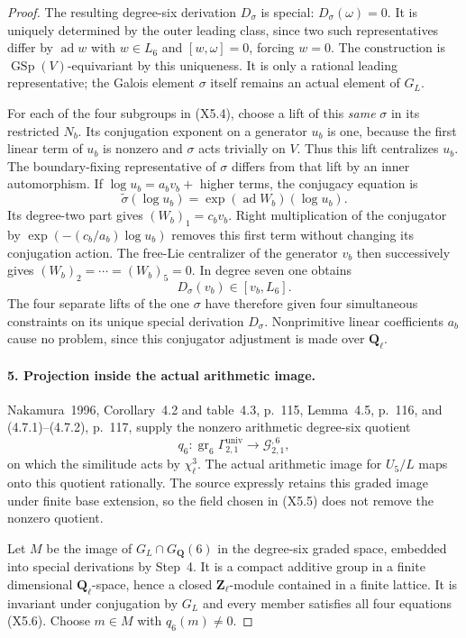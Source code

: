 \begin{proof}
The resulting degree-six derivation $D_\sigma$ is special:
$D_\sigma(\omega)=0$. It is uniquely determined by the
outer leading class, since two such representatives differ
by $\operatorname{ad}w$ with $w\in L_6$ and
$[w,\omega]=0$, forcing $w=0$. The construction is
$\operatorname{GSp}(V)$-equivariant by this uniqueness.
It is only a rational leading representative; the Galois
element $\sigma$ itself remains an actual element of $G_L$.

For each of the four subgroups in (X5.4), choose a lift of
this \emph{same} $\sigma$ in its restricted $N_b$. Its
conjugation exponent on a generator $u_b$ is one, because
the first linear term of $u_b$ is nonzero and $\sigma$ acts
trivially on $V$. Thus this lift centralizes $u_b$.
The boundary-fixing representative of $\sigma$ differs
from that lift by an inner automorphism. If
$\log u_b=a_bv_b+$ higher terms, the conjugacy equation is
\[
 \widetilde\sigma(\log u_b)
  =\exp(\operatorname{ad}W_b)(\log u_b).
\]
Its degree-two part gives $(W_b)_1=c_bv_b$. Right
multiplication of the conjugator by
$\exp(-(c_b/a_b)\log u_b)$ removes this first term without
changing its conjugation action. The free-Lie centralizer
of the generator $v_b$ then successively gives
$(W_b)_2=\cdots=(W_b)_5=0$. In degree seven one obtains
\[
 D_\sigma(v_b)\in[v_b,L_6].
 \tag{X5.6}
\]
The four separate lifts of the one $\sigma$ have therefore
given four simultaneous constraints on its unique special
derivation $D_\sigma$. Nonprimitive linear coefficients
$a_b$ cause no problem, since this conjugator adjustment
is made over $\mathbf Q_\ell$.

\paragraph{5. Projection inside the actual arithmetic image.}
Nakamura~1996, Corollary~4.2 and table~4.3, p.~115,
Lemma~4.5, p.~116, and (4.7.1)--(4.7.2), p.~117, supply\cite{AuditNakamura1996}
the nonzero arithmetic degree-six quotient
\[
 q_6:\operatorname{gr}_6\Gamma^{\mathrm{univ}}_{2,1}
       \longrightarrow \mathcal G_{2,1}^{,6},
\]
on which the similitude acts by $\chi_\ell^3$.
The actual arithmetic image for $U_5/L$ maps onto this
quotient rationally. The source expressly retains this
graded image under finite base extension, so the field
chosen in (X5.5) does not remove the nonzero quotient.

Let $M$ be the image of $G_L\cap G_{\mathbf Q}(6)$ in the
degree-six graded space, embedded into special derivations
by Step~4. It is a compact additive group in a finite
dimensional $\mathbf Q_\ell$-space, hence a closed
$\mathbf Z_\ell$-module contained in a finite lattice.
It is invariant under conjugation by $G_L$ and every
member satisfies all four equations (X5.6).
Choose $m\in M$ with $q_6(m)\ne0$.


\end{proof}
